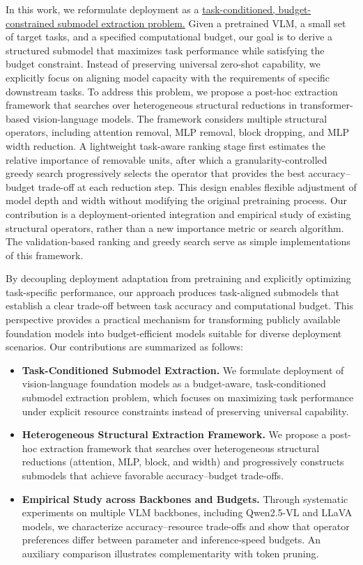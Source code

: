 \documentclass[11pt]{article}
\begin{document}
In this work, we reformulate deployment as a \ul{task-conditioned, budget-constrained submodel extraction problem.} Given a pretrained VLM, a small set of target tasks, and a specified computational budget, 
our goal is to derive a structured submodel that maximizes task performance while satisfying the budget constraint. 
Instead of preserving universal zero-shot capability, we explicitly focus on aligning model capacity with the 
requirements of specific downstream tasks.
To address this problem, we propose a post-hoc extraction framework that searches over heterogeneous structural 
reductions in transformer-based vision-language models. The framework considers multiple structural operators, 
including attention removal, MLP removal, block dropping, and MLP width reduction. A lightweight task-aware ranking 
stage first estimates the relative importance of removable units, after which a granularity-controlled greedy search 
progressively selects the operator that provides the best accuracy–budget trade-off at each reduction step. 
This design enables flexible adjustment of model depth and width without modifying the original pretraining process. Our contribution is a deployment-oriented integration and empirical study of existing structural operators, rather than a new importance metric or search algorithm. The validation-based ranking and greedy search serve as simple implementations of this framework.

By decoupling deployment adaptation from pretraining and explicitly optimizing task-specific performance, 
our approach produces task-aligned submodels that establish a clear trade-off between task accuracy and computational 
budget. This perspective provides a practical mechanism for transforming publicly available foundation models into 
budget-efficient models suitable for diverse deployment scenarios.
Our contributions are summarized as follows:

\begin{itemize}

\item \textbf{Task-Conditioned Submodel Extraction.}
We formulate deployment of vision-language foundation models as a budget-aware, task-conditioned submodel extraction problem, 
which focuses on maximizing task performance under explicit resource constraints instead of preserving universal capability.

\item \textbf{Heterogeneous Structural Extraction Framework.}
We propose a post-hoc extraction framework that searches over heterogeneous structural reductions 
(attention, MLP, block, and width) and progressively constructs submodels that achieve favorable accuracy–budget trade-offs.

\item \textbf{Empirical Study across Backbones and Budgets.}
Through systematic experiments on multiple VLM backbones, including Qwen2.5-VL and LLaVA models, 
we characterize accuracy--resource trade-offs and show that operator preferences differ between parameter and inference-speed budgets. An auxiliary comparison illustrates complementarity with token pruning.

\end{itemize}
\end{document}
